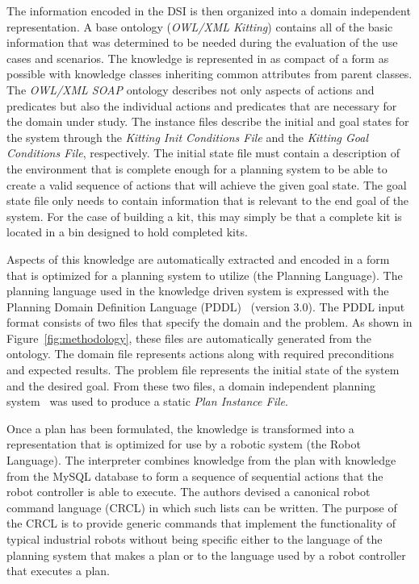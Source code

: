 The information encoded in the DSI is then organized into a domain independent representation. A base ontology (\textit{OWL/XML Kitting}) contains all of the basic information that was determined to be needed during the evaluation of the use cases and scenarios. The knowledge is represented in as compact of a form as possible with knowledge classes inheriting common attributes from parent classes. The \textit{OWL/XML SOAP} ontology describes not only aspects of actions and predicates but also the individual actions and predicates that are necessary for the domain under study. The instance files describe the initial and goal states for the system through the \textit{Kitting Init Conditions File} and the \textit{Kitting Goal Conditions File}, respectively. The initial state file must contain a description of the environment that is complete enough for a planning system to be able to create a valid sequence of actions that will achieve the given goal state. The goal state file only needs to contain information that is relevant to the end goal of the system. For the case of building a kit, this may simply be that a complete kit is located in a bin designed to hold completed kits.


Aspects of this knowledge are automatically extracted and encoded in a form that is optimized for a planning system to utilize (the Planning Language). The planning language used in the knowledge driven system is expressed with the Planning Domain Definition Language (PDDL)~\cite{PDDL} (version 3.0). The PDDL input format consists of two files that specify the domain and the problem. As shown in Figure~\ref{fig:methodology}, these files are automatically generated from the ontology. The domain file represents actions along with required preconditions and expected results. The problem file represents the initial state of the system and the desired goal. From these two files, a domain independent planning system~\cite{Coles.ICAPS.2010} was used to produce a static \textit{Plan Instance File}. 

Once a plan has been formulated, the knowledge is transformed into a representation that is optimized for use by a robotic system (the Robot Language). The interpreter combines knowledge from the plan with knowledge from the MySQL database to form a sequence of sequential actions that the robot controller is able to execute. The authors devised a canonical robot command language (CRCL) in which such lists can be written. The purpose of the CRCL is to provide generic commands that implement the functionality of typical industrial robots without being specific either to the language of the planning system that makes a plan or to the language used by a robot controller that executes a plan.


